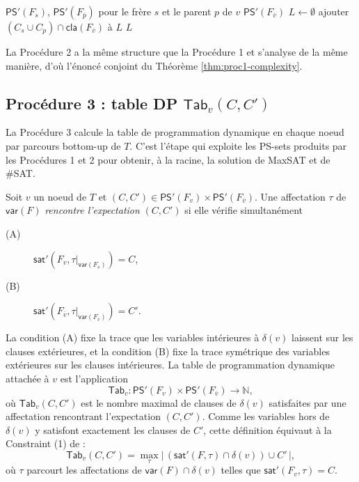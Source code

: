 \documentclass[11pt,a4paper]{report}
\theoremstyle{plain}
\theoremstyle{definition}
\begin{document}
\begin{algorithm}[H]
\caption{Génération de $\mathsf{PS}'(F_{\overline{v}})$}
\label{algo:proc2}
\begin{algorithmic}[1]
\Require $\mathsf{PS}'(F_s)$, $\mathsf{PS}'(F_{\overline{p}})$ pour le frère $s$ et le parent $p$ de $v$
\Ensure $\mathsf{PS}'(F_{\overline{v}})$
\State $L \leftarrow \emptyset$
  \State ajouter $(C_s \cup C_p) \cap \mathsf{cla}(F_{\overline{v}})$ à $L$
\EndFor
\State \Return $L$
\end{algorithmic}
\end{algorithm}

La Procédure 2 a la même structure que la Procédure 1 et s'analyse de
la même manière, d'où l'énoncé conjoint du
Théorème \ref{thm:proc1-complexity}.

\subsection{Procédure 3 : table DP $\mathsf{Tab}_v(C, C')$}
\label{ssec:theo-proc3}

La Procédure 3 calcule la table de programmation dynamique en chaque
noeud par parcours bottom-up de $T$. C'est l'étape qui exploite les
PS-sets produits par les Procédures 1 et 2 pour obtenir, à la racine,
la solution de MaxSAT et de \#SAT.

Soit $v$ un noeud de $T$ et
$(C, C') \in \mathsf{PS}'(F_v) \times \mathsf{PS}'(F_{\overline{v}})$. Une
affectation $\tau$ de $\mathsf{var}(F)$ \emph{rencontre l'expectation}
$(C, C')$ si elle vérifie simultanément
\begin{description}
  \item[(A)] $\mathsf{sat}'(F_v, \tau|_{\mathsf{var}(F_v)}) = C$,
  \item[(B)] $\mathsf{sat}'(F_{\overline{v}}, \tau|_{\mathsf{var}(F_{\overline{v}})}) = C'$.
\end{description}
La condition (A) fixe la trace que les variables intérieures à
$\delta(v)$ laissent sur les clauses extérieures, et la condition (B)
fixe la trace symétrique des variables extérieures sur les clauses
intérieures. La table de programmation dynamique attachée à $v$ est
l'application
\[
  \mathsf{Tab}_v : \mathsf{PS}'(F_v) \times \mathsf{PS}'(F_{\overline{v}}) \to \mathbb{N},
\]
où $\mathsf{Tab}_v(C, C')$ est le nombre maximal de clauses de $\delta(v)$
satisfaites par une affectation rencontrant l'expectation $(C, C')$.
Comme les variables hors de $\delta(v)$ y satisfont exactement les
clauses de $C'$, cette définition équivaut à la Constraint (1)
de \cite{saether2015} :
\begin{equation}
  \mathsf{Tab}_v(C, C') = \max_{\tau} \bigl|\,(\mathsf{sat}'(F, \tau) \cap \delta(v)) \cup C'\,\bigr|,
  \label{eq:tab-constraint}
\end{equation}
où $\tau$ parcourt les affectations de $\mathsf{var}(F) \cap \delta(v)$
telles que $\mathsf{sat}'(F_v, \tau) = C$.
\end{document}
